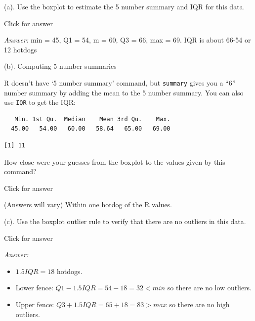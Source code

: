 \documentclass[
]{book}
\newenvironment{Shaded}{\begin{snugshade}}{\end{snugshade}}
\newcommand{\FunctionTok}[1]{\textcolor[rgb]{0.00,0.00,0.00}{#1}}
\newcommand{\NormalTok}[1]{#1}
\newcommand{\SpecialCharTok}[1]{\textcolor[rgb]{0.00,0.00,0.00}{#1}}
\providecommand{\tightlist}{%
  \setlength{\itemsep}{0pt}\setlength{\parskip}{0pt}}
\begin{document}
(a). Use the boxplot to estimate the 5 number summary and IQR for this data.

Click for answer

\emph{Answer:} min = 45, Q1 = 54, m = 60, Q3 = 66, max = 69. IQR is about 66-54 or 12 hotdogs

(b). Computing 5 number summaries

R doesn't have `5 number summary' command, but \texttt{summary} gives you a ``6'' number summary by adding the mean to the 5 number summary. You can also use \texttt{IQR} to get the IQR:

\begin{Shaded}
\end{Shaded}

\begin{verbatim}
   Min. 1st Qu.  Median    Mean 3rd Qu.    Max. 
  45.00   54.00   60.00   58.64   65.00   69.00 
\end{verbatim}

\begin{Shaded}
\end{Shaded}

\begin{verbatim}
[1] 11
\end{verbatim}

How close were your guesses from the boxplot to the values given by this command?

Click for answer

(Answers will vary) Within one hotdog of the R values.

(c). Use the boxplot outlier rule to verify that there are no outliers in this data.

Click for answer

\emph{Answer:}

\begin{itemize}
\tightlist
\item
  \(1.5IQR = 18\) hotdogs.
\item
  Lower fence: \(Q1 - 1.5 IQR = 54 - 18 = 32 < min\) so there are no low outliers.
\item
  Upper fence: \(Q3 + 1.5 IQR = 65 + 18 = 83 > max\) so there are no high outliers.
\end{itemize}
\end{document}

